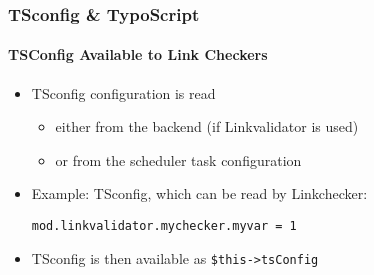 %

\begin{frame}[fragile]
	\frametitle{TSconfig \& TypoScript}
	\framesubtitle{TSConfig Available to Link Checkers}

	\begin{itemize}
		\item TSconfig configuration is read

			\begin{itemize}
				\item either from the backend (if Linkvalidator is used)
				\item or from the scheduler task configuration
			\end{itemize}

		\item Example: TSconfig, which can be read by Linkchecker:

			\lstinline!mod.linkvalidator.mychecker.myvar = 1!

		\item TSconfig is then available as \texttt{\$this->tsConfig}
	\end{itemize}

\end{frame}


